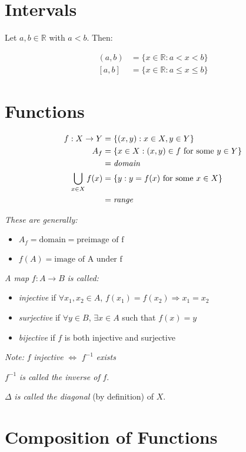 \documentclass[12pt,a4paper]{article}
\begin{document}
\section{Intervals}

Let $a,b \in \mathbb{R}$ with $a < b$. Then:

\begin{align*}
(a,b) &= \{x \in \mathbb{R} : a < x < b\} \\
[a,b] &= \{x \in \mathbb{R} : a \leq x \leq b\}
\end{align*}

\section{Functions}

\begin{align*}
f: X \to Y &= \{(x,y) : x \in X, y \in Y\} \\
A_f &= \{x \in X : (x,y) \in f \text{ for some } y \in Y\} \\
&= \text{\textit{domain}} \\
\bigcup_{x \in X} f(x) &= \{y : y = f(x) \text{ for some } x \in X\} \\
&= \text{\textit{range}}
\end{align*}

\textit{These are generally:}
\begin{itemize}
\item $A_f = \text{domain} = \text{preimage of f}$
\item $f(A) = \text{image of A under f}$
\end{itemize}

\textit{A map} $f: A \to B$ \textit{is called:}
\begin{itemize}
\item \textit{injective} if $\forall x_1, x_2 \in A$, $f(x_1) = f(x_2) \Rightarrow x_1 = x_2$
\item \textit{surjective} if $\forall y \in B$, $\exists x \in A$ such that $f(x) = y$
\item \textit{bijective} if $f$ is both injective and surjective
\end{itemize}

\textit{Note:} $f$ \textit{injective} $\Leftrightarrow$ $f^{-1}$ \textit{exists}

$f^{-1}$ \textit{is called the inverse of} $f$.

$\Delta$ \textit{is called the diagonal} (by definition) of $X$.

\section{Composition of Functions}
\end{document}
